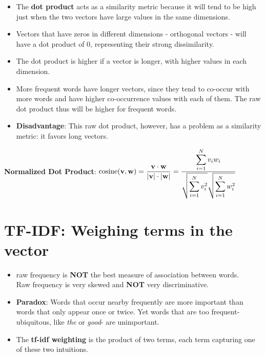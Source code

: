 \begin{itemize}
    \item The \textbf{dot product} acts as a similarity metric because it will tend to be high just when the two vectors have large values in the same dimensions. 
    
    \item Vectors that have zeros in different dimensions - orthogonal vectors - will have a dot product of 0, representing their strong dissimilarity.

    \item The dot product is higher if a vector is longer, with higher values in each dimension.
    
    \item More frequent words have longer vectors, since they tend to co-occur with more words and have higher co-occurrence values with each of them. The raw dot product thus will be higher for frequent words.

    \item \textbf{Disadvantage}: This raw dot product, however, has a problem as a similarity metric: it favors long vectors.

    
\end{itemize}


\textbf{Normalized Dot Product}: \( \displaystyle \operatorname{cosine}(\mathbf{v,w}) = \frac{\mathbf{v\cdot w}}{|\mathbf{v}|\cdot|\mathbf{w}|} = \frac{\displaystyle\sum_{i=1}^{N} v_i w_i}{\displaystyle \sqrt{\sum_{i=1}^{N} v_i^2}\sqrt{\sum_{i=1}^{N} w_i^2}} \)


\section{TF-IDF: Weighing terms in the vector \cite{nlp-1}}\label{TF-IDF: Weighing terms in the vector}

\begin{itemize}
    \item raw frequency is \textbf{NOT} the best measure of association between words.\\
    Raw frequency is very skewed and \textbf{NOT} very discriminative.

    \item \textbf{Paradox}: Words that occur nearby frequently are more important than words that only appear once or twice. Yet words that are too frequent-ubiquitous, like \textit{the} or \textit{good}- are unimportant.

    \item The \textbf{tf-idf weighting} is the product of two terms, each term capturing one of these two intuitions.
\end{itemize}


